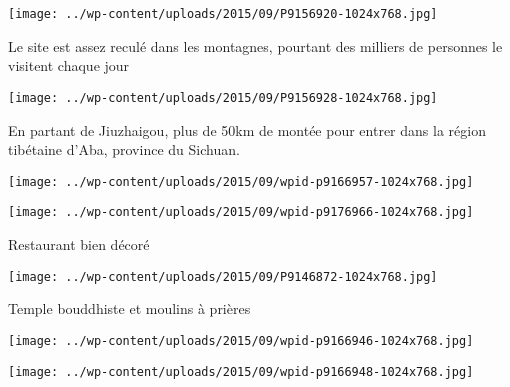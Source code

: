  

 

\begin{center} \texttt{[image: ../wp-content/uploads/2015/09/P9156920-1024x768.jpg]} \end{center}

 

 Le site est assez reculé dans les montagnes, pourtant des milliers de personnes le visitent chaque jour 

 

\begin{center} \texttt{[image: ../wp-content/uploads/2015/09/P9156928-1024x768.jpg]} \end{center}

 

 En partant de Jiuzhaigou, plus de 50km de montée pour entrer dans la région tibétaine d'Aba, province du Sichuan. 

 

\begin{center} \texttt{[image: ../wp-content/uploads/2015/09/wpid-p9166957-1024x768.jpg]} \end{center}

 

 

\begin{center} \texttt{[image: ../wp-content/uploads/2015/09/wpid-p9176966-1024x768.jpg]} \end{center}

 

 Restaurant bien décoré 

 

\begin{center} \texttt{[image: ../wp-content/uploads/2015/09/P9146872-1024x768.jpg]} \end{center}

 

 Temple bouddhiste et moulins à prières 

 

\begin{center} \texttt{[image: ../wp-content/uploads/2015/09/wpid-p9166946-1024x768.jpg]} \end{center}

 

 

\begin{center} \texttt{[image: ../wp-content/uploads/2015/09/wpid-p9166948-1024x768.jpg]} \end{center}

